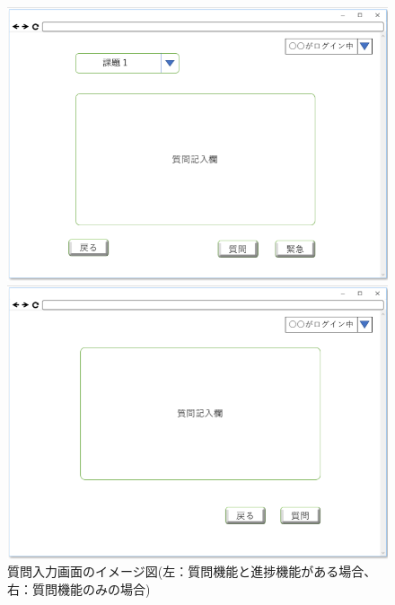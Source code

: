 \begin{figure}[htbp]
 \begin{minipage}{0.5\hsize}
  \begin{center}
   \includegraphics[width=1\linewidth,clip]{./img/36.png}
  \end{center}

 \end{minipage}
 \begin{minipage}{0.5\hsize}
  \begin{center}
   \includegraphics[width=1\linewidth,clip]{./img/37.png}
  \end{center}
 \end{minipage}
 \caption{質問入力画面のイメージ図(左：質問機能と進捗機能がある場合、右：質問機能のみの場合)}\label{fig:36}
\end{figure}

\newpage

